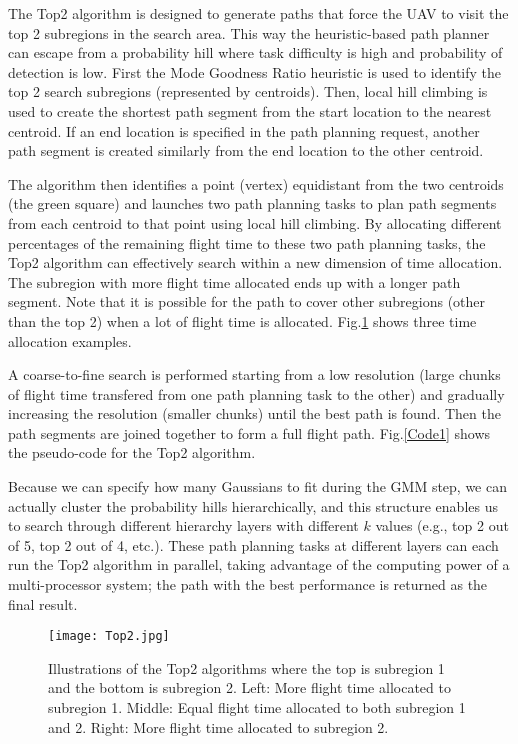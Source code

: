 \documentclass[journal]{IEEEtran}
\begin{document}
The Top2 algorithm is designed to generate paths that force the UAV to visit the top 2 subregions in the search area. This way the heuristic-based path planner can escape from a probability hill where task difficulty is high and probability of detection is low. First the Mode Goodness Ratio heuristic is used to identify the top 2 search subregions (represented by centroids). Then, local hill climbing is used to create the shortest path segment from the start location to the nearest centroid. If an end location is specified in the path planning request, another path segment is created similarly from the end location to the other centroid. 

The algorithm then identifies a point (vertex) equidistant from the two centroids (the green square) and launches two path planning tasks to plan path segments from each centroid to that point using local hill climbing. By allocating different percentages of the remaining flight time to these two path planning tasks, the Top2 algorithm can effectively search within a new dimension of time allocation. The subregion with more flight time allocated ends up with a longer path segment. Note that it is possible for the path to cover other subregions (other than the top 2) when a lot of flight time is allocated. Fig.\ref{Top2} shows three time allocation examples. 

A coarse-to-fine search is performed starting from a low resolution (large chunks of flight time transfered from one path planning task to the other) and gradually increasing the resolution (smaller chunks) until the best path is found. Then the path segments are joined together to form a full flight path. Fig.\ref{Code1} shows the pseudo-code for the Top2 algorithm.

Because we can specify how many Gaussians to fit during the GMM step, we can actually cluster the probability hills hierarchically, and this structure enables us to search through different hierarchy layers with different $k$ values (e.g., top 2 out of 5, top 2 out of 4, etc.). These path planning tasks at different layers can each run the Top2 algorithm in parallel, taking advantage of the computing power of a multi-processor system; the path with the best performance is returned as the final result.
\begin{figure}
\centering
\texttt{[image: Top2.jpg]}
\caption{Illustrations of the Top2 algorithms where the top is subregion 1 and the bottom is subregion 2. Left: More flight time allocated to subregion 1. Middle: Equal flight time allocated to both subregion 1 and 2. Right: More flight time allocated to subregion 2.}
\label{Top2}
\end{figure}
\end{document}
